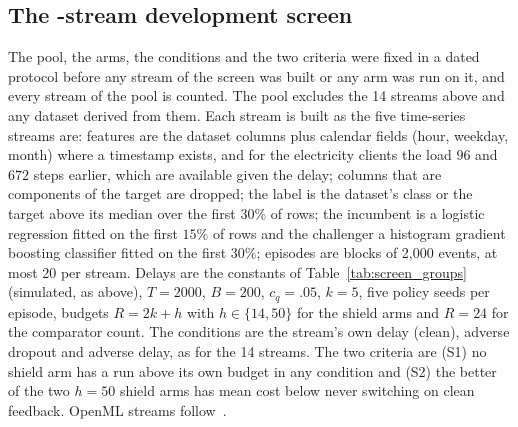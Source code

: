 \documentclass[10pt]{article}
\theoremstyle{plain}
\theoremstyle{definition}
\begin{document}
\begin{table}[!htbp]
\caption{Cached-loss summary for the 14 streams. Episodes are blocks of 2{,}000 events (\NStreamEpisodes{} in total); delays are simulated constants. Error columns give mean 0/1 loss across all events and episodes; disagreement is the fraction of events where the two losses differ (the exposure rate $r$); the final column states which model has lower mean loss. Rates are displayed to three decimals.}\label{tab:streams}
\centering\small

\end{table}

\subsection{The \ScreenPool-stream development screen}\label{app:screen}
The pool, the arms, the conditions and the two criteria were fixed in a dated protocol before any stream of the screen was built or any arm was run on it, and every stream of the pool is counted. The pool excludes the 14 streams above and any dataset derived from them. Each stream is built as the five time-series streams are: features are the dataset columns plus calendar fields (hour, weekday, month) where a timestamp exists, and for the electricity clients the load $96$ and $672$ steps earlier, which are available given the delay; columns that are components of the target are dropped; the label is the dataset's class or the target above its median over the first $30\%$ of rows; the incumbent is a logistic regression fitted on the first $15\%$ of rows and the challenger a histogram gradient boosting classifier fitted on the first $30\%$; episodes are blocks of 2{,}000 events, at most 20 per stream. Delays are the constants of Table~\ref{tab:screen_groups} (simulated, as above), $T=2000$, $B=200$, $c_q=.05$, $k=5$, five policy seeds per episode, budgets $R=2k+h$ with $h\in\{14,50\}$ for the shield arms and $R=24$ for the comparator count. The conditions are the stream's own delay (clean), adverse dropout and adverse delay, as for the 14 streams. The two criteria are (S1) no shield arm has a run above its own budget in any condition and (S2) the better of the two $h=50$ shield arms has mean cost below never switching on clean feedback. OpenML streams follow~\citep{vanschoren2014openml}.

\begin{table}[!htbp]
\caption{Groups of the public screen: source, label, simulated delay in events, number of streams in the pool and number that meet S2 (the better $h=50$ shield arm costs less than never switching on clean feedback).}\label{tab:screen_groups}
\centering\small

\end{table}
\end{document}
